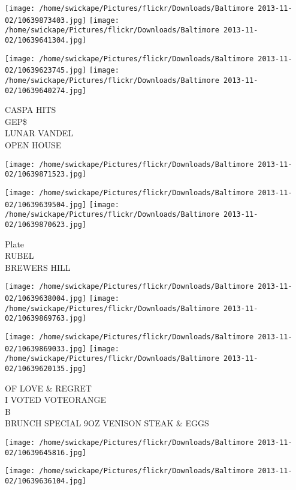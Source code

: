 \documentclass[10pt,letterpaper]{article}
\begin{document}
\texttt{[image: /home/swickape/Pictures/flickr/Downloads/Baltimore 2013-11-02/10639873403.jpg]}
\texttt{[image: /home/swickape/Pictures/flickr/Downloads/Baltimore 2013-11-02/10639641304.jpg]}

\texttt{[image: /home/swickape/Pictures/flickr/Downloads/Baltimore 2013-11-02/10639623745.jpg]}
\texttt{[image: /home/swickape/Pictures/flickr/Downloads/Baltimore 2013-11-02/10639640274.jpg]}

CASPA HITS\\
GEP\$\\
LUNAR VANDEL\\
OPEN HOUSE\\
\pagebreak

\texttt{[image: /home/swickape/Pictures/flickr/Downloads/Baltimore 2013-11-02/10639871523.jpg]}

\vspace{0.25in}
\texttt{[image: /home/swickape/Pictures/flickr/Downloads/Baltimore 2013-11-02/10639639504.jpg]}
\texttt{[image: /home/swickape/Pictures/flickr/Downloads/Baltimore 2013-11-02/10639870623.jpg]}

Plate\\
RUBEL\\
BREWERS HILL\\
\pagebreak

\texttt{[image: /home/swickape/Pictures/flickr/Downloads/Baltimore 2013-11-02/10639638004.jpg]}
\texttt{[image: /home/swickape/Pictures/flickr/Downloads/Baltimore 2013-11-02/10639869763.jpg]}

\texttt{[image: /home/swickape/Pictures/flickr/Downloads/Baltimore 2013-11-02/10639869033.jpg]}
\texttt{[image: /home/swickape/Pictures/flickr/Downloads/Baltimore 2013-11-02/10639620135.jpg]}

OF LOVE \& REGRET\\
I VOTED VOTEORANGE\\
B\\
BRUNCH SPECIAL 9OZ VENISON STEAK \& EGGS\\
\pagebreak

\texttt{[image: /home/swickape/Pictures/flickr/Downloads/Baltimore 2013-11-02/10639645816.jpg]}

\vspace{0.25in}
\texttt{[image: /home/swickape/Pictures/flickr/Downloads/Baltimore 2013-11-02/10639636104.jpg]}
\end{document}
